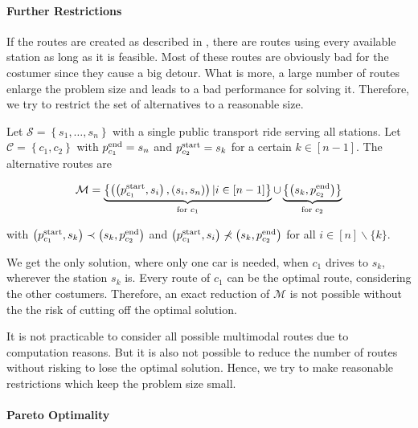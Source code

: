 \paragraph{Further Restrictions} \parfill

If the routes are created as described in , there are routes using every available station as long as it is feasible. Most of these routes are obviously bad for the costumer since they cause a big detour. What is more, a large number of routes enlarge the problem size and leads to  a bad performance for solving it. Therefore, we try to restrict the set of alternatives to a reasonable size.

\begin{example}

Let $\mathcal{S}=\left\{s_1,\dots,s_n\right\}$ with a single public transport ride serving all stations. Let $\mathcal{C}=\left\{c_1,c_2\right\}$ with $p^{\operatorname{end}}_{c_1}=s_n$ and $p^{\operatorname{start}}_{c_2}=s_k$ for a certain $k\in[n-1]$. The alternative routes are

\begin{align*}
	\mathcal{M} = \underbrace{\left\{\left(\left(p^{\operatorname{start}}_{c_1},s_i\right),\left(s_i,s_n\right)\right)|i\in[n-1]\right\}}_{\text{for }c_1}\cup\underbrace{\left\{\left(s_k,p^{\operatorname{end}}_{c_2}\right)\right\}}_{\text{for }c_2}
\end{align*}

with $\left(p^{\operatorname{start}}_{c_1},s_k\right)\prec\left(s_k,p^{\operatorname{end}}_{c_2}\right)$ and $\left(p^{\operatorname{start}}_{c_1},s_i\right)\not\prec\left(s_k,p^{\operatorname{end}}_{c_2}\right)$ for all $i\in[n]\backslash\{k\}$. 

We get the only solution, where only one car is needed, when $c_1$ drives to $s_k$, wherever the station $s_k$ is. Every route of $c_1$ can be the optimal route, considering the other costumers. Therefore, an exact reduction of $\mathcal{M}$ is not possible without the the risk of cutting off the optimal solution.
	
\end{example}

It is not practicable to consider all possible multimodal routes due to computation reasons. But it is also not possible to reduce the number of routes without risking to lose the optimal solution. Hence, we try to make reasonable restrictions which keep the problem size small.

\paragraph{Pareto Optimality} \parfill

